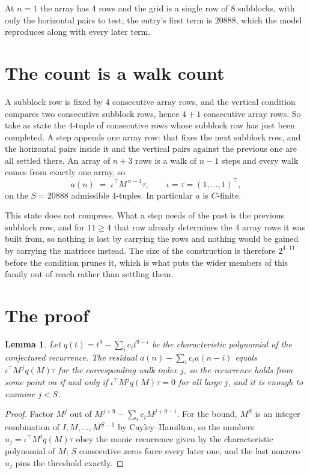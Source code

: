 \documentclass[11pt,a4paper]{article}
\theoremstyle{plain}
\newtheorem{lemma}[theorem]{Lemma}
\theoremstyle{definition}
\begin{document}
At $n=1$ the array has $4$ rows and the grid is a single row of $8$
subblocks, with only the horizontal pairs to test; the entry's first term is
$20888$, which the model reproduces along with every later term.

\section{The count is a walk count}

A subblock row is fixed by $4$ consecutive array rows, and the vertical condition compares
two consecutive subblock rows, hence $4+1$ consecutive array rows. So take as state the
$4$-tuple of consecutive rows whose subblock row has just been completed. A step appends one
array row: that fixes the next subblock row, and the horizontal pairs inside it and the
vertical pairs against the previous one are all settled there. An array of $n+3$ rows is
a walk of $n-1$ steps and every walk comes from exactly one array, so
\[
a(n)\;=\;\iota^{\!\top}M^{\,n-1}\tau,\qquad\iota=\tau=(1,\dots,1)^{\!\top},
\]
on the $S=20888$ admissible $4$-tuples. In particular $a$ is $C$-finite.

This state does not compress. What a step needs of the past is the previous subblock row, and
for $11\ge4$ that row already determines the $4$ array rows it was built from, so nothing
is lost by carrying the rows and nothing would be gained by carrying the matrices instead. The
size of the construction is therefore $2^{4\cdot11}$ before the condition prunes
it, which is what puts the wider members of this family out of reach rather than settling them.

\section{The proof}

\begin{lemma}\label{lem:crit}
Let $q(t)=t^{9}-\sum_i c_it^{9-i}$ be the characteristic polynomial of the
conjectured recurrence. The residual $a(n)-\sum_ic_ia(n-i)$ equals
$\iota^{\!\top}M^{\,j}q(M)\tau$ for the corresponding walk index $j$, so the recurrence
holds from some point on if and only if $\iota^{\!\top}M^{j}q(M)\tau=0$ for all large $j$,
and it is enough to examine $j<S$.
\end{lemma}

\begin{proof}
Factor $M^{j}$ out of $M^{j+9}-\sum_ic_iM^{j+9-i}$. For the bound, $M^{S}$
is an integer combination of $I,M,\dots,M^{S-1}$ by Cayley--Hamilton, so the numbers
$u_j=\iota^{\!\top}M^{j}q(M)\tau$ obey the monic recurrence given by the characteristic
polynomial of $M$; $S$ consecutive zeros force every later one, and the last nonzero $u_j$
pins the threshold exactly.
\end{proof}
\end{document}
